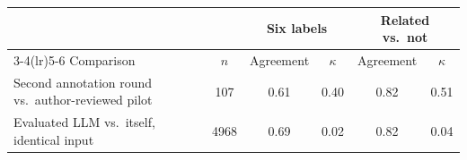 \begin{tabular}{lccccc}
\toprule
 & & \multicolumn{2}{c}{Six labels} & \multicolumn{2}{c}{Related vs.\ not} \\
\cmidrule(lr){3-4}\cmidrule(lr){5-6}
Comparison & $n$ & Agreement & $\kappa$ & Agreement & $\kappa$ \\
\midrule
Second annotation round vs.\ author-reviewed pilot & 107 & 0.61 & 0.40 & 0.82 & 0.51 \\
Evaluated LLM vs.\ itself, identical input & 4968 & 0.69 & 0.02 & 0.82 & 0.04 \\
\bottomrule
\end{tabular}
